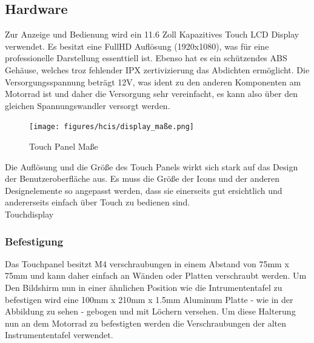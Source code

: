 \subsection{Hardware}

Zur Anzeige und Bedienung wird ein 11.6 Zoll Kapazitives Touch LCD Display verwendet. Es besitzt eine FullHD Auflösung (1920x1080), was für eine professionelle Darstellung essenttiell ist. Ebenso hat es ein schützendes ABS Gehäuse, welches troz fehlender IPX zertivizierung das Abdichten ermöglicht. Die Versorgungsspannung beträgt 12V, was ident zu den anderen Komponenten am Motorrad ist und daher die Versorgung sehr vereinfacht, es kann also über den gleichen Spannungswandler versorgt werden.

\begin{figure}[H]
	\begin{center}
		\texttt{[image: figures/hcis/display\_maße.png]}
		\caption{Touch Panel Maße}
		\label{fig:panel}
	\end{center}
\end{figure}

Die Auflösung und die Größe des Touch Panels wirkt sich stark auf das Design der Benutzeroberfläche aus. Es muss die Größe der Icons und der anderen Designelemente so angepasst werden, dass sie einerseits gut ersichtlich und andererseits einfach über Touch zu bedienen sind.\\
Touchdisplay

\newpage

\subsubsection{Befestigung}
Das Touchpanel besitzt M4 verschraubungen in einem Abstand von 75mm x 75mm und kann daher einfach an Wänden oder Platten verschraubt werden. Um Den Bildshirm nun in einer ähnlichen Position wie die Intrumententafel zu befestigen wird eine 100mm x 210mm x 1.5mm Aluminum Platte - wie in der Abbildung zu sehen - gebogen und mit Löchern versehen. Um diese Halterung nun an dem Motorrad zu befestigten werden die Verschraubungen der alten Instrumententafel verwendet.

